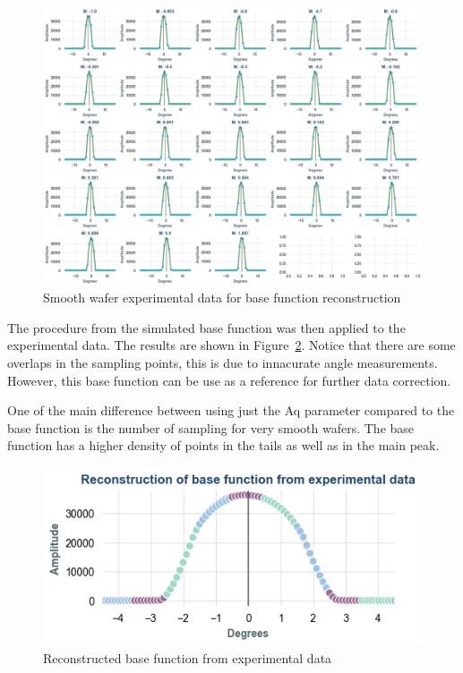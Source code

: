 \documentclass[
  letterpaper,
  DIV=11,
  numbers=noendperiod,
  oneside]{scrreprt}
\begin{document}
\begin{figure}

{\centering \includegraphics{notebooks/b_base_function_files/figure-pdf/fig-3-4-output-1.png}

}

\caption{\label{fig-3-4}Smooth wafer experimental data for base function
reconstruction}

\end{figure}

The procedure from the simulated base function was then applied to the
experimental data. The results are shown in Figure~\ref{fig-3-5}. Notice
that there are some overlaps in the sampling points, this is due to
innacurate angle measurements. However, this base function can be use as
a reference for further data correction.

One of the main difference between using just the Aq parameter compared
to the base function is the number of sampling for very smooth wafers.
The base function has a higher density of points in the tails as well as
in the main peak.

\begin{figure}

{\centering \includegraphics{notebooks/b_base_function_files/figure-pdf/fig-3-5-output-1.png}

}

\caption{\label{fig-3-5}Reconstructed base function from experimental
data}

\end{figure}
\end{document}
